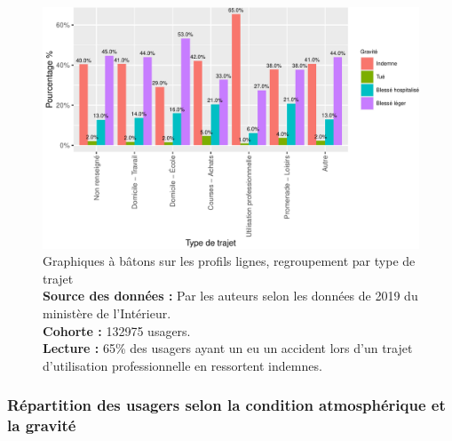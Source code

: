 \documentclass[french,]{tp}
\begin{document}
\begin{figure}[ht!]

{\centering \includegraphics{Prediction_Gravite_files/figure-latex/barplot2-1} 

}

\caption{Graphiques à bâtons sur les profils lignes, regroupement par type de trajet\\
\textbf{Source des données :} Par les auteurs selon les données de 2019 du ministère de l'Intérieur.\\
\textbf{Cohorte :} 132975 usagers.\\
\textbf{Lecture :} 65\% des usagers ayant un eu un accident lors d'un trajet d'utilisation professionnelle en ressortent indemnes.}\label{fig:barplot2}
\end{figure}
\newpage

\hypertarget{ruxe9partition-des-usagers-selon-la-condition-atmosphuxe9rique-et-la-gravituxe9}{%
\subsubsection{Répartition des usagers selon la condition atmosphérique et la gravité}\label{ruxe9partition-des-usagers-selon-la-condition-atmosphuxe9rique-et-la-gravituxe9}}
\end{document}
